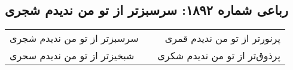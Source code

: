 \begin{center}
\section*{رباعی شماره ۱۸۹۲: سرسبزتر از تو من ندیدم شجری}
\label{sec:1892}
\begin{longtable}{l p{0.5cm} r}
سرسبزتر از تو من ندیدم شجری
&&
پرنورتر از تو من ندیدم قمری
\\
شبخیزتر از تو من ندیدم سحری
&&
پرذوق‌تر از تو من ندیدم شکری
\\
\end{longtable}
\end{center}

